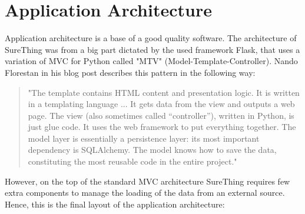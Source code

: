\section{Application Architecture}
\label{sec:applicationarchitecture}
Application architecture is a base of a good quality software. The architecture of SureThing was from a big part dictated by the used framework Flask, that uses a variation of MVC for Python called "MTV" (Model-Template-Controller). Nando Florestan \cite{article:goodArchitecture} in his blog post describes this pattern in the following way:

\begin{quote}
"The template contains HTML content and presentation logic. It is written in a templating language ... It gets data from the view and outputs a web page. The view (also sometimes called “controller”), written in Python, is just glue code. It uses the web framework to put everything together. The model layer is essentially a persistence layer: its most important dependency is SQLAlchemy. The model knows how to save the data, constituting the most reusable code in the entire project."
\end{quote}

However, on the top of the standard MVC architecture SureThing requires few extra components to manage the loading of the data from an external source. Hence, this is the final layout of the application architecture:

